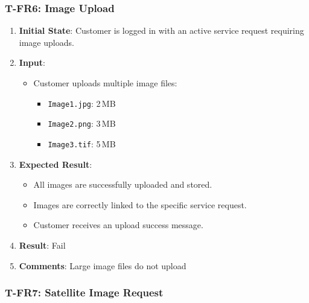 \documentclass[12pt, titlepage]{article}
\begin{document}
\subsubsection*{T-FR6: Image Upload}

\begin{enumerate}
    \item \textbf{Initial State}: Customer is logged in with an active service request requiring image uploads.
    \item \textbf{Input}:
    \begin{itemize}
        \item Customer uploads multiple image files:
        \begin{itemize}
            \item \texttt{Image1.jpg}: 2\,MB
            \item \texttt{Image2.png}: 3\,MB
            \item \texttt{Image3.tif}: 5\,MB
        \end{itemize}
    \end{itemize}
        \item \textbf{Expected Result}:
        \begin{itemize}
            \item All images are successfully uploaded and stored.
            \item Images are correctly linked to the specific service request.
            \item Customer receives an upload success message.
        \end{itemize}
        \item \textbf{Result}: Fail
        \item \textbf{Comments}: Large image files do not upload
\end{enumerate}

\subsubsection*{T-FR7: Satellite Image Request}
\end{document}
